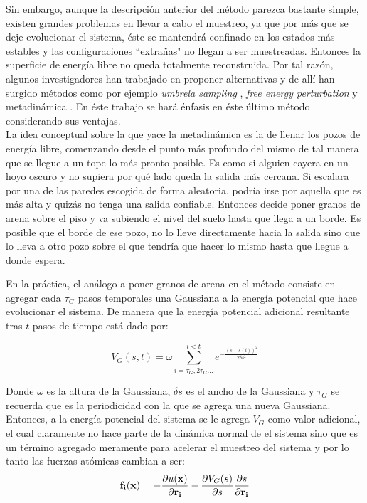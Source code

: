 \documentclass [11pt]{article}
\begin{document}
Sin embargo, aunque la descripción anterior del método parezca bastante simple, existen grandes problemas en llevar a cabo el muestreo, ya que por más que se deje evolucionar el sistema, éste se mantendrá confinado en los estados más estables y las configuraciones ``extrañas" no llegan a ser muestreadas. Entonces la superficie de energía libre no queda totalmente reconstruida. Por tal razón, algunos investigadores han trabajado en proponer alternativas y de allí han surgido métodos como por ejemplo {\it umbrela sampling} \cite{patey-valleau}, {\it free energy perturbation} \cite{bash-singh} y metadinámica \cite{laio-gervasio}. En éste trabajo se hará énfasis en éste último método considerando sus ventajas. \\

La idea conceptual sobre la que yace la metadinámica es la de llenar los pozos de energía libre, comenzando desde el punto más profundo del mismo de tal manera que se llegue a un tope lo más pronto posible. Es como si alguien cayera en un hoyo oscuro y no supiera por qué lado queda la salida más cercana. Si escalara por una de las paredes escogida de forma aleatoria, podría irse por aquella que es más alta y quizás no tenga una salida confiable. Entonces decide poner granos de arena sobre el piso y va subiendo el nivel del suelo hasta que llega a un borde. Es posible que el borde de ese pozo, no lo lleve directamente hacia la salida sino que lo lleva a otro pozo sobre el que tendría que hacer lo mismo hasta que llegue a donde espera.

En la práctica, el análogo a poner granos de arena en el método consiste en agregar cada $\tau_G$ pasos temporales una Gaussiana a la energía potencial que hace evolucionar el sistema. De manera que la energía potencial adicional resultante tras $t$ pasos de tiempo está dado por:

\begin{equation}
    V_G(s,t)=\omega\sum_{i=\tau_G,2\tau_G...}^{i<t}e^{-\frac{(s-s(i))^2}{2\delta s^2}}
\end{equation}

 Donde $\omega$ es la altura de la Gaussiana, $\delta s$ es el ancho de la Gaussiana y $\tau_G$ se recuerda que es la periodicidad con la que se agrega una nueva Gaussiana. Entonces, a la energía potencial del sistema se le agrega $V_G$ como valor adicional, el cual claramente no hace parte de la dinámica normal de el sistema sino que es un término agregado meramente para acelerar el muestreo del sistema y por lo tanto las fuerzas atómicas cambian a ser:
 \begin{equation}\label{forces}
    {\bf f_i}({\bf x})=-\frac{\partial u({\bf x})}{\partial {\bf r_i}}-\frac{\partial V_G(s)}{\partial s}\frac{\partial s}{\partial {\bf r_i}}
\end{equation}
\end{document}
